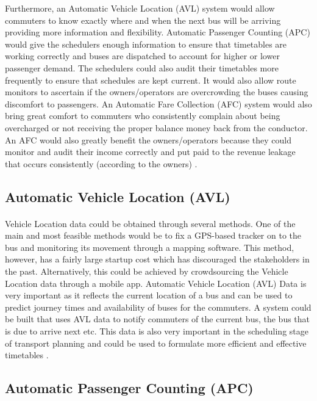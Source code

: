 Furthermore, an Automatic Vehicle Location (AVL) system would allow commuters to know exactly where and when the next bus will be arriving providing more information and flexibility. Automatic Passenger Counting (APC) would give the schedulers enough information to ensure that timetables are working correctly and buses are dispatched to account for higher or lower passenger demand. The schedulers could also audit their timetables more frequently to ensure that schedules are kept current. It would also allow route monitors to ascertain if the owners/operators are overcrowding the buses causing discomfort to passengers. An Automatic Fare Collection (AFC) system would also bring great comfort to commuters who consistently complain about being overcharged or not receiving the proper balance money back from the conductor. An AFC would also greatly benefit the owners/operators because they could monitor and audit their income correctly and put paid to the revenue leakage that occurs consistently (according to the owners) \cite{Wilson2008, Wilson2009, Wilson2012, Fijalkowski2010}.

\subsection{Automatic Vehicle Location (AVL)}

\paragraph{ } Vehicle Location data could be obtained through several methods. One of the main and most feasible methods would be to fix a GPS-based tracker on to the bus and monitoring its movement through a mapping software. This method, however, has a fairly large startup cost which has discouraged the stakeholders in the past. Alternatively, this could be achieved by crowdsourcing the Vehicle Location data through a mobile app. Automatic Vehicle Location (AVL) Data is very important as it reflects the current location of a bus and can be used to predict journey times and availability of buses for the commuters. A system could be built that uses AVL data to notify commuters of the current bus, the bus that is due to arrive next etc. This data is also very important in the scheduling stage of transport planning and could be used to formulate more efficient and effective timetables \cite{Wilson2009}.

\subsection{Automatic Passenger Counting (APC)}

